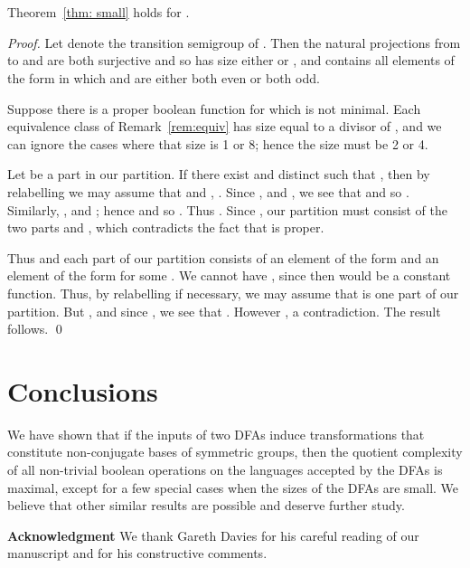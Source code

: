 \documentclass{llncs}
\newcommand{\noin}{\noindent}
\begin{document}
\section{}
\begin{proposition}
Theorem~\ref{thm: small} holds for .
\end{proposition}
\begin{proof}
Let  denote the transition semigroup of .  Then the natural projections from  to  and  are both surjective and so  has size either  or , and  contains all elements of the form  in which  and  are either both even or both odd.

Suppose there is a proper boolean function  for which  is not minimal.  
Each equivalence class of Remark~\ref{rem:equiv} has size equal to a divisor of , and we can ignore the cases where that size is 1 or 8; hence the size must be 2 or 4. 

Let  be a part in our partition.  
If there exist  and distinct  such that , then by relabelling we may assume that  and , .  
Since , and , we see that  and so .  
Similarly, , and ; hence  and so .  
Thus .  
Since , our partition must consist of the two parts  and , which contradicts the fact that  is proper.  

Thus   and each part of our partition consists of an element of the form  and an element of the form  for some .  We  cannot have , since then   would be a constant function.  Thus, by relabelling if necessary, we may assume that  is one part of our partition.  But , and since , we see that .  However , a contradiction.  The result follows.
\qed
\end{proof}
\section{Conclusions}
\label{sec:conc}
We have shown that if the inputs of two DFAs induce transformations that constitute non-conjugate bases of symmetric groups, then the quotient complexity of all non-trivial boolean operations on the languages accepted by the DFAs is maximal, except for a few special cases when the sizes of the DFAs are small. We believe that other similar results are possible and deserve further study.
\smallskip 

\noin
{\bf Acknowledgment}
We thank Gareth Davies for his careful reading of our manu\-script and for his constructive comments.
\end{document}
